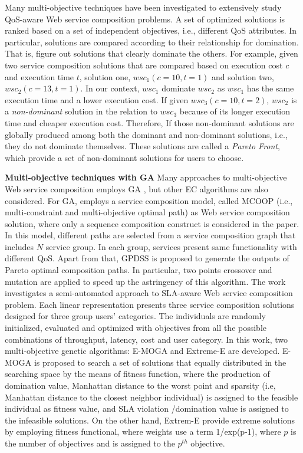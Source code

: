 Many multi-objective techniques \cite{liu2005dynamic,zhang2010qos,yu2013efficient,yin2014hybrid,xiang2014qos,chen2014partial} have been investigated to extensively study QoS-aware Web service composition problems.  A set of optimized solutions is ranked based on a set of independent objectives, i.e., different QoS attributes. In particular, solutions are compared according to their relationship for domination. That is, figure out solutions that clearly dominate the others. For example, given two service composition solutions that are compared based on execution cost $c$ and execution time $t$, solution one, $wsc_1(c=10,t=1)$ and solution two,  $wsc_2(c=13,t=1)$. In our context, $wsc_1$ dominate $wsc_2$ as $wsc_1$ has the same execution time and a lower execution cost. If given $wsc_3(c=10,t=2)$, $wsc_2$ is a \textit{non-dominant} solution in the relation to $wsc_3$ because of its longer execution time and cheaper execution cost. Therefore,  If those non-dominant solutions are globally produced among both the dominant and non-dominant solutions, i.e., they do not dominate themselves. These solutions are called a \textit{Pareto Front}, which provide a set of non-dominant solutions for users to choose.


\textbf{Multi-objective techniques with GA} Many approaches to multi-objective Web service composition employs GA \cite{liu2005dynamic}, but other EC algorithms are also considered. For GA, \cite{liu2005dynamic} employs a service composition model, called  MCOOP (i.e., multi-constraint and multi-objective optimal path) as Web service composition solution, where only a sequence composition construct is considered in the paper. In this model, different paths are selected from a service composition graph that includes $N$ service group. In each group,  services present same functionality with different QoS.  Apart from that, GPDSS is proposed to generate the outputs of Pareto optimal composition paths. In particular, two points crossover and mutation are applied to speed up the astringency of this algorithm. The work \cite{wada2012e3} investigates a semi-automated approach to SLA-aware Web service composition problem.  Each linear representation presents three service composition solutions designed for three group users' categories.  The individuals are randomly initialized, evaluated and optimized with objectives from all the possible combinations of throughput, latency, cost and user category.  In this work, two multi-objective genetic algorithms: E-MOGA and Extreme-E are developed. E-MOGA is proposed to search a set of solutions that equally distributed in the searching space by the means of fitness function, where the production of domination value,  Manhattan distance to the worst point and sparsity (i.e, Manhattan distance to the closest neighbor individual)  is assigned to the feasible individual as fitness value, and SLA violation /domination value is assigned to the infeasible solutions. On the other hand, Extrem-E provide extreme solutions by employing fitness functional, where weights use a term 1/exp(p-1), where $p$ is the number of objectives and is assigned to the $p^{th}$ objective.

